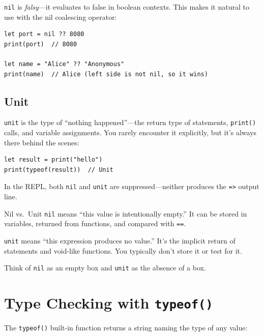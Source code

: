 \lstinline|nil| is \emph{falsy}---it evaluates to false in boolean contexts.
This makes it natural to use with the nil coalescing operator:

\begin{lstlisting}[language=Lattice, caption={Nil coalescing with ??}]
let port = nil ?? 8080
print(port)  // 8080

let name = "Alice" ?? "Anonymous"
print(name)  // Alice (left side is not nil, so it wins)
\end{lstlisting}

\subsection{Unit}\label{subsec:unit}

\lstinline|unit| is the type of ``nothing happened''---the return type of statements, \lstinline|print()| calls, and variable assignments.
You rarely encounter it explicitly, but it's always there behind the scenes:

\begin{lstlisting}[language=Lattice, caption={Unit in action}]
let result = print("hello")
print(typeof(result))  // Unit
\end{lstlisting}

In the REPL, both \lstinline|nil| and \lstinline|unit| are suppressed---neither produces the \lstinline|=>| output line.

\begin{defnbox}{Nil vs.\ Unit}
\lstinline|nil| means ``this value is intentionally empty.''
It can be stored in variables, returned from functions, and compared with \lstinline|==|.

\lstinline|unit| means ``this expression produces no value.''
It's the implicit return of statements and void-like functions.
You typically don't store it or test for it.

Think of \lstinline|nil| as an empty box and \lstinline|unit| as the absence of a box.
\end{defnbox}

\section{Type Checking with \texttt{typeof()}}\label{sec:typeof}

The \lstinline|typeof()| built-in function returns a string naming the type of any value:

